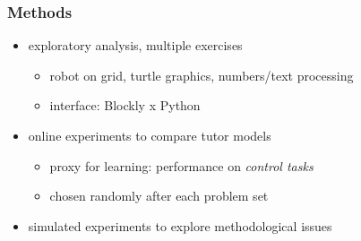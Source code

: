 \documentclass[bigger]{beamer}
\begin{document}
\begin{frame}
  \frametitle{Methods}

  \begin{itemize}
  \item exploratory analysis, multiple exercises
    \begin{itemize}
    \item robot on grid, turtle graphics, numbers/text processing
    \item interface: Blockly x Python
    \end{itemize}

  \item online experiments to compare tutor models
    \begin{itemize}
    \item proxy for learning: performance on \emph{control tasks}
    \item chosen randomly after each problem set
    \end{itemize}

  \item simulated experiments to explore methodological issues
  \end{itemize}

\end{frame}
\end{document}
